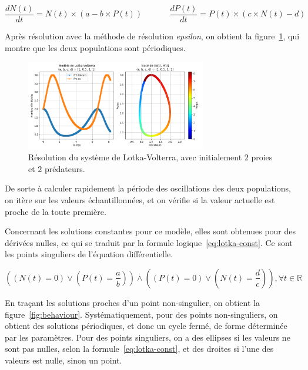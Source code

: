 \begin{equation}
	\label{eq:lotka}
	\frac{dN(t)}{dt} = N(t) \times (a - b \times P(t)) \ \ \ \ \ \ \ \ \ \ \ \ \ \ \
	\frac{dP(t)}{dt} = P(t) \times (c \times N(t) - d)
\end{equation}

Après résolution avec la méthode de résolution \textit{epsilon}, on obtient la figure~\ref{fig:lotka}, qui montre que les deux populations sont périodiques.

\begin{figure}[htbp!]
	\centering
	\includegraphics[width=0.7\textwidth]{res/lotka}
	\caption{Résolution du système de Lotka-Volterra, avec initialement $2$ proies et $2$ prédateurs.}
	\label{fig:lotka}
\end{figure}

De sorte à calculer rapidement la période des oscillations des deux populations, on itère
sur les valeurs échantillonnées, et on vérifie si la valeur actuelle est proche de la toute première.

Concernant les solutions constantes pour ce modèle, elles sont obtenues pour des dérivées nulles,
ce qui se traduit par la formule logique~\ref{eq:lotka-const}. Ce sont les points singuliers
de l'équation différentielle.

\begin{equation}
	\label{eq:lotka-const}
	\left(\left(N(t) = 0\right) \vee \left(P(t) = \frac{a}{b}\right)\right)
	\wedge
	\left(\left(P(t) = 0\right) \vee \left(N(t) = \frac{d}{c}\right)\right), \forall t \in \mathbb{R}
\end{equation}

En traçant les solutions proches d'un point non-singulier, on obtient la figure~\ref{fig:behaviour}. Systématiquement,
pour des points non-singuliers, on obtient des solutions périodiques, et donc un cycle fermé, de forme déterminée par les paramètres.
Pour des points singuliers, on a des ellipses si les valeurs ne sont pas nulles, selon la formule~\ref{eq:lotka-const},
et des droites si l'une des valeurs est nulle, sinon un point.


